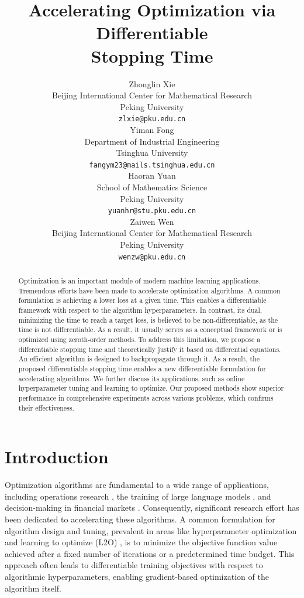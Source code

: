 \documentclass{article}
\title{Accelerating Optimization via Differentiable \\ Stopping Time}
\author{%
  Zhonglin Xie\\
  Beijing International Center for Mathematical Research\\
  Peking University\\
  \texttt{zlxie@pku.edu.cn} \\
  \And
  Yiman Fong \\
  Department of Industrial Engineering \\
  Tsinghua University \\
  \texttt{fangym23@mails.tsinghua.edu.cn} \\
  \And
  Haoran Yuan \\
  School of Mathematics Science \\
  Peking University \\
  \texttt{yuanhr@stu.pku.edu.cn} \\
  \And
  Zaiwen Wen \\
  Beijing International Center for Mathematical Research\\
  Peking University\\
  \texttt{wenzw@pku.edu.cn} \\
}
\begin{document}
\maketitle


\begin{abstract}
Optimization is an important module of modern machine learning applications. Tremendous efforts have been made to accelerate optimization algorithms. A common formulation is achieving a lower loss at a given time. This enables a differentiable framework with respect to the algorithm hyperparameters. In contrast, its dual, minimizing the time to reach a target loss, is believed to be non-differentiable, as the time is not differentiable. As a result, it usually serves as a conceptual framework or is optimized using zeroth-order methods. To address this limitation, we propose a differentiable stopping time and theoretically justify it based on differential equations. An efficient algorithm is designed to backpropagate through it. As a result, the proposed differentiable stopping time enables a new differentiable formulation for accelerating algorithms. We further discuss its applications, such as online hyperparameter tuning and learning to optimize. Our proposed methods show superior performance in comprehensive experiments across various problems, which confirms their effectiveness.
\end{abstract}

\section{Introduction}
\label{sec:introduction}

Optimization algorithms are fundamental to a wide range of applications, including operations research \cite{taha1997operations}, the training of large language models \cite{zhao2025surveylargelanguagemodels}, and decision-making in financial markets \cite{pilbeam2018finance}. Consequently, significant research effort has been dedicated to accelerating these algorithms. A common formulation for algorithm design and tuning, prevalent in areas like hyperparameter optimization \cite{feurer2019hyperparameter}  and learning to optimize (L2O) \cite{chen2024learning}, is to minimize the objective function value achieved after a fixed number of iterations or a predetermined time budget. This approach often leads to differentiable training objectives with respect to algorithmic hyperparameters, enabling gradient-based optimization of the algorithm itself.
\end{document}
